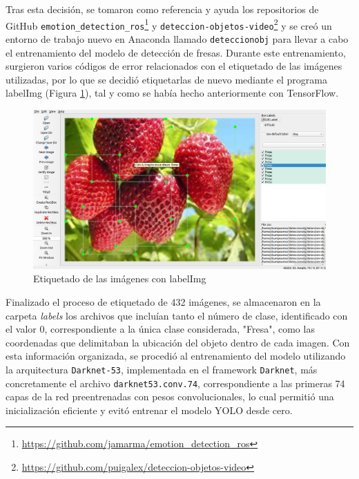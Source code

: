 Tras esta decisión, se tomaron como referencia y ayuda los repositorios de GitHub \verb|emotion_detection_ros|\footnote{\url{https://github.com/jamarma/emotion_detection_ros}} y \verb|deteccion-objetos-video|\footnote{\url{https://github.com/puigalex/deteccion-objetos-video}} y se creó un entorno de trabajo nuevo en Anaconda llamado \verb|deteccionobj| para llevar a cabo el entrenamiento del modelo de detección de fresas. Durante este entrenamiento, surgieron varios códigos de error relacionados con el etiquetado de las imágenes utilizadas, por lo que se decidió etiquetarlas de nuevo mediante el programa labelImg (Figura \ref{fig:labelImg_Fresas}), tal y como se había hecho anteriormente con TensorFlow.

 \begin{figure}[H]
     \centering
     \begin{center}
       \includegraphics[width=150mm]{figs/labelImg Fresa.png}
     \end{center}
     \caption{Etiquetado de las imágenes con labelImg}
    \label{fig:labelImg_Fresas}
  \end{figure}

Finalizado el proceso de etiquetado de 432 imágenes, se almacenaron en la carpeta \textit{labels} los archivos que incluían tanto el número de clase, identificado con el valor 0, correspondiente a la única clase considerada, "Fresa",  como las coordenadas que delimitaban la ubicación del objeto dentro de cada imagen. Con esta información organizada, se procedió al entrenamiento del modelo utilizando la arquitectura \verb|Darknet-53|, implementada en el framework \verb|Darknet|, más concretamente el archivo \verb|darknet53.conv.74|, correspondiente a las primeras 74 capas de la red preentrenadas con pesos convolucionales, lo cual permitió una inicialización eficiente y evitó entrenar el modelo YOLO desde cero.

